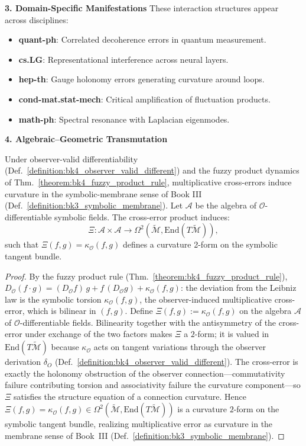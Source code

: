 \begin{scholium}
\textbf{3. Domain-Specific Manifestations}
These interaction structures appear across disciplines:
\begin{itemize}
    \item \textbf{quant-ph}: Correlated decoherence errors in quantum measurement.
    \item \textbf{cs.LG}: Representational interference across neural layers.
    \item \textbf{hep-th}: Gauge holonomy errors generating curvature around loops.
    \item \textbf{cond-mat.stat-mech}: Critical amplification of fluctuation products.
    \item \textbf{math-ph}: Spectral resonance with Laplacian eigenmodes.
\end{itemize}

\textbf{4. Algebraic--Geometric Transmutation}
\begin{theorem}
\label{theorem:bk4_multiplication_to_curvature}
Under observer-valid differentiability (Def.~\ref{definition:bk4_observer_valid_different}) and the fuzzy product dynamics of Thm.~\ref{theorem:bk4_fuzzy_product_rule}, multiplicative cross-errors induce curvature in the symbolic-membrane sense of Book III (Def.~\ref{definition:bk3_symbolic_membrane}).
Let $\mathcal{A}$ be the algebra of $\mathcal{O}$-differentiable symbolic fields. The cross-error product induces:
\[
\Xi: \mathcal{A} \times \mathcal{A} \rightarrow \Omega^2(\tilde{\mathcal{M}}, \mathrm{End}(T\tilde{\mathcal{M}})),
\]
such that $\Xi(f,g) = \kappa_{\mathcal{O}}(f,g)$ defines a curvature 2-form on the symbolic tangent bundle.
\end{theorem}

\begin{proof}
\label{proof:bk4_multiplication_to_curvature}
\leavevmode
By the fuzzy product rule (Thm.~\ref{theorem:bk4_fuzzy_product_rule}), $D_{\mathcal{O}}(f\cdot g) = (D_{\mathcal{O}}f)\,g + f\,(D_{\mathcal{O}}g) + \kappa_{\mathcal{O}}(f,g)$: the deviation from the Leibniz law is the symbolic torsion $\kappa_{\mathcal{O}}(f,g)$, the observer-induced multiplicative cross-error, which is bilinear in $(f,g)$. Define $\Xi(f,g) := \kappa_{\mathcal{O}}(f,g)$ on the algebra $\mathcal{A}$ of $\mathcal{O}$-differentiable fields. Bilinearity together with the antisymmetry of the cross-error under exchange of the two factors makes $\Xi$ a $2$-form; it is valued in $\mathrm{End}(T\tilde{\mathcal{M}})$ because $\kappa_{\mathcal{O}}$ acts on tangent variations through the observer derivation $\delta_O$ (Def.~\ref{definition:bk4_observer_valid_different}). The cross-error is exactly the holonomy obstruction of the observer connection---commutativity failure contributing torsion and associativity failure the curvature component---so $\Xi$ satisfies the structure equation of a connection curvature. Hence $\Xi(f,g) = \kappa_{\mathcal{O}}(f,g) \in \Omega^2(\tilde{\mathcal{M}}, \mathrm{End}(T\tilde{\mathcal{M}}))$ is a curvature $2$-form on the symbolic tangent bundle, realizing multiplicative error as curvature in the membrane sense of Book~III (Def.~\ref{definition:bk3_symbolic_membrane}).
\end{proof}


\end{scholium}
